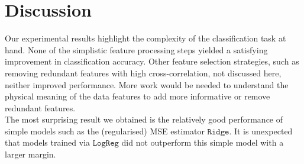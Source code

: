 \documentclass[10pt,conference,compsocconf]{IEEEtran}
\newcommand{\Ridge}{\mathtt{Ridge}}
\newcommand{\LogReg}{\mathtt{LogReg}}
\begin{document}
\vspace*{-2mm}
\section{Discussion}
Our experimental results highlight the complexity of the classification task at hand. None of the simplistic feature processing steps yielded a satisfying improvement in classification accuracy. Other feature selection strategies, such as removing redundant features with high cross-correlation, not discussed here, neither improved performance.
More work would be needed to understand the physical meaning of the data features to add more informative or remove redundant features.\\
The most surprising result we obtained is the relatively good performance of simple models such as the (regularised) MSE estimator $\Ridge$. It is unexpected that models trained via $\LogReg$ did not outperform this simple model with a larger margin.



\end{document}

